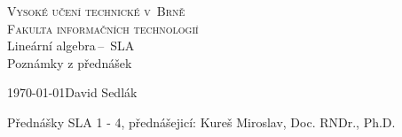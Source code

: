 \documentclass[a4paper, 11pt]{article}
\theoremstyle{break}
\begin{document}
\begin{titlepage}

	\begin{center}
		\textsc{\Huge Vysoké učení technické v~Brně}\\
				  \huge{\textsc{Fakulta informačních technologií}}\\
		{\LARGE 	Lineární algebra\,--\, SLA}\\
				{\Huge Poznámky z přednášek}
	\end{center}
	{\Large\today \hfill David Sedlák}

\end{titlepage}

\tableofcontents







\newpage

\def\refname{Reference}

Přednášky SLA 1 - 4, přednášejicí: Kureš Miroslav, Doc. RNDr., Ph.D.
\end{document}

